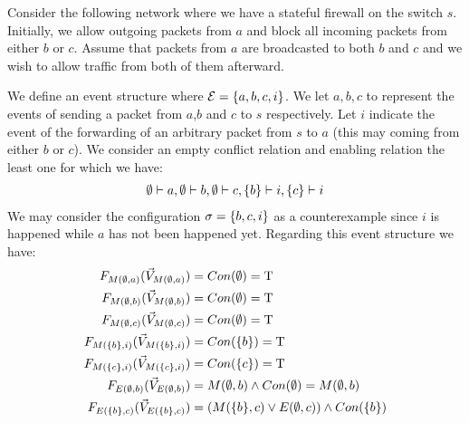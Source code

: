 \begin{example}
    Consider the following network where we have
    a stateful firewall on the switch $s$.
    Initially, we allow outgoing packets from $a$ and
    block all incoming packets from either $b$ or $c$.
    Assume that packets from $a$ are broadcasted to
    both $b$ and $c$ and we wish to allow traffic
    from both of them afterward.
    \begin{center}
    \end{center}
    We define an event structure where
    $\mathcal{E} = \{a,b,c,i\}$.
    We let $a,b,c$ to represent the events of sending
    a packet from $a$,$b$ and $c$ to $s$ respectively.
    Let $i$ indicate the event of the forwarding of
    an arbitrary packet from $s$ to $a$ (this may coming
    from either $b$ or $c$).
    We consider an empty conflict relation and enabling
    relation the least one for which we have:
    \begin{align*}
        \emptyset \vdash a,\emptyset \vdash b, \emptyset \vdash c,
        \{b\} \vdash i, \{c\} \vdash i
    \end{align*}
    We may consider the configuration $\sigma = \{b,c,i\}$ as a
    counterexample since $i$ is happened while $a$ has not been happened yet.
    Regarding this event structure we have:
    \begin{align*}
        \f{M(\e,a)}      & = Con(\e) =  \T                                  \\
        \f{M(\e,b)}      & = Con(\e) =  \T                                  \\
        \f{M(\e,c)}      & = Con(\e) = \T                                   \\
        \f{M(\s{b},i)}   & = Con(\s{b}) =  \T                               \\
        \f{M(\s{c},i)}   & = Con(\s{c}) =  \T                               \\
        \f{E(\e,b)}      & = M(\e,b) \wedge Con(\e) = M(\e,b)               \\
        \f{E(\s{b},c)}   & = (M(\s{b},c) \vee E(\e,c)) \wedge Con(\s{b})    \\

\end{align*}
\end{example}
